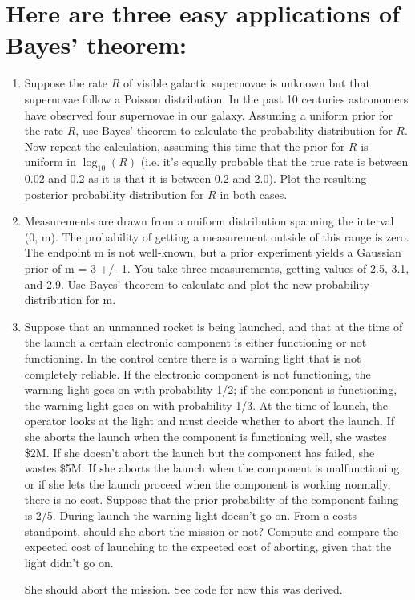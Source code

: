 \section{Here are three easy applications of Bayes' theorem:}

\begin{enumerate}[label=\textbf{\Alph*}.]
    \item Suppose the rate $R$ of visible galactic supernovae is unknown but that supernovae follow a Poisson distribution. In the past 10 centuries astronomers have observed four supernovae in our galaxy. Assuming a uniform prior for the rate $R$, use Bayes' theorem to calculate the probability distribution for $R$. Now repeat the calculation, assuming this time that the prior for $R$ is uniform in $\log_{10}(R)$ (i.e. it's equally probable that the true rate is between 0.02 and 0.2 as it is that it is between 0.2 and 2.0). Plot the resulting posterior probability distribution for $R$ in both cases.


    \item Measurements are drawn from a uniform distribution spanning the interval (0, m). The probability of getting a measurement outside of this range is zero. The endpoint m is not well-known, but a prior experiment yields a Gaussian prior of m = 3 +/- 1. You take three measurements, getting values of 2.5, 3.1, and 2.9. Use Bayes' theorem to calculate and plot the new probability distribution for m.


    \item Suppose that an unmanned rocket is being launched, and that at the time of the launch a certain electronic component is either functioning or not functioning. In the control centre there is a warning light that is not completely reliable. If the electronic component is not functioning, the warning light goes on with probability 1/2; if the component is functioning, the warning light goes on with probability 1/3. At the time of launch, the operator looks at the light and must decide whether to abort the launch. If she aborts the launch when the component is functioning well, she wastes \$2M. If she doesn't abort the launch but the component has failed, she wastes \$5M. If she aborts the launch when the component is malfunctioning, or if she lets the launch proceed when the component is working normally, there is no cost. Suppose that the prior probability of the component failing is 2/5. During launch the warning light doesn't go on. From a costs standpoint, should she abort the mission or not? Compute and compare the expected cost of launching to the expected cost of aborting, given that the light didn't go on.

    She should abort the mission. See code for now this was derived.

\end{enumerate}
